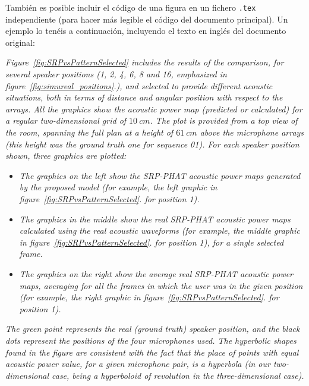 \documentclass[spanish,openright]{book}
\begin{document}
También es posible incluir el código de una figura en un fichero
\texttt{.tex} independiente (para hacer más legible el código del
documento principal). Un ejemplo lo tenéis a continuación, incluyendo el
texto en inglés del documento original:

\emph{Figure~\ref{fig:SRPvsPatternSelected} includes the results of the
comparison, for several speaker positions (1, 2, 4, 6, 8 and 16,
emphasized in
figure~\ref{fig:simureal_positions}.),
and selected to provide different acoustic situations, both in terms of
distance and angular position with respect to the arrays. All the
graphics show the acoustic power map (predicted or calculated) for a
regular two-dimensional grid of $10~cm$. The plot is provided from a top
view of the room, spanning the full plan at a height of $61~cm$ above the
microphone arrays (this height was the ground truth one for sequence
01). For each speaker position shown, three graphics are plotted:}

\begin{itemize}
\item \emph{The graphics on the left show the SRP-PHAT acoustic power maps
  generated by the proposed model (for example, the left graphic in
  figure~\ref{fig:SRPvsPatternSelected}.
  for position 1).}
\item \emph{The graphics in the middle show the real SRP-PHAT acoustic power
  maps calculated using the real acoustic waveforms (for example, the
  middle graphic in
  figure~\ref{fig:SRPvsPatternSelected}.
  for position 1), for a single selected frame.}
\item \emph{The graphics on the right show the average real SRP-PHAT acoustic
  power maps, averaging for all the frames in which the user was in the
  given position (for example, the right graphic in
  figure~\ref{fig:SRPvsPatternSelected}.
  for position 1).}
\end{itemize}

\emph{The green point represents the real (ground truth) speaker
position, and the black dots represent the positions of the four
microphones used. The hyperbolic shapes found in the figure are
consistent with the fact that the place of points with equal acoustic
power value, for a given microphone pair, is a hyperbola (in our
two-dimensional case, being a hyperboloid of revolution in the
three-dimensional case).}
\end{document}
